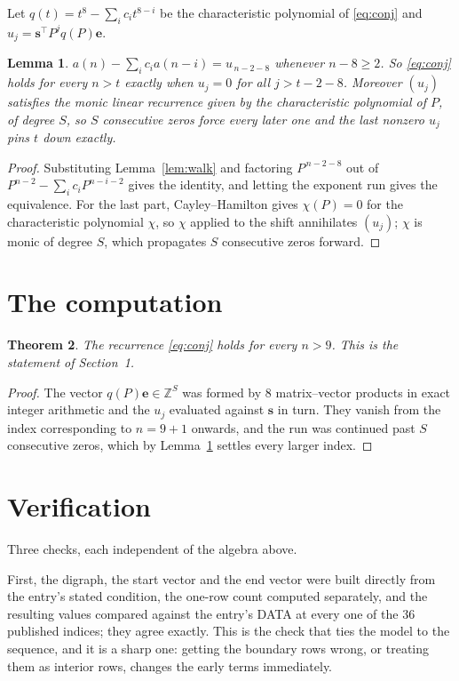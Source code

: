 \documentclass[11pt,a4paper]{article}
\theoremstyle{plain}
\newtheorem{theorem}{Theorem}
\newtheorem{lemma}[theorem]{Lemma}
\theoremstyle{definition}
\begin{document}
Let $q(t)=t^{8}-\sum_i c_i t^{8-i}$ be the characteristic polynomial of
\eqref{eq:conj} and $u_j=\mathbf{s}^{\!\top}P^{j}q(P)\mathbf{e}$.

\begin{lemma}\label{lem:crit}
$a(n)-\sum_i c_i a(n-i)=u_{\,n-2-8}$ whenever $n-8\ge2$. So \eqref{eq:conj}
holds for every $n>t$ exactly when $u_j=0$ for all $j>t-2-8$. Moreover $(u_j)$
satisfies the monic linear recurrence given by the characteristic polynomial of $P$, of
degree $S$, so $S$ consecutive zeros force every later one and the last nonzero $u_j$ pins
$t$ down exactly.
\end{lemma}

\begin{proof}
Substituting Lemma~\ref{lem:walk} and factoring $P^{\,n-2-8}$ out of
$P^{n-2}-\sum_i c_i P^{n-i-2}$ gives the identity, and letting the exponent run gives the
equivalence. For the last part, Cayley--Hamilton gives $\chi(P)=0$ for the characteristic
polynomial $\chi$, so $\chi$ applied to the shift annihilates $(u_j)$; $\chi$ is monic of
degree $S$, which propagates $S$ consecutive zeros forward.
\end{proof}

\section{The computation}

\begin{theorem}
The recurrence \eqref{eq:conj} holds for every $n>9$. This is the statement of
Section~1.
\end{theorem}

\begin{proof}
The vector $q(P)\mathbf{e}\in\mathbb{Z}^{S}$ was formed by $8$ matrix--vector
products in exact integer arithmetic and the $u_j$ evaluated against $\mathbf{s}$ in turn.
They vanish from the index corresponding to $n=9+1$ onwards, and the run was continued
past $S$ consecutive zeros, which by Lemma~\ref{lem:crit} settles every larger index.
\end{proof}

\section{Verification}

Three checks, each independent of the algebra above.

First, the digraph, the start vector and the end vector were built directly from the
entry's stated condition, the one-row count computed separately, and the resulting values
compared against the entry's DATA at every one of the $36$ published indices; they
agree exactly. This is the check that ties the model to the sequence, and it is a sharp one:
getting the boundary rows wrong, or treating them as interior rows, changes the early terms
immediately.
\end{document}
